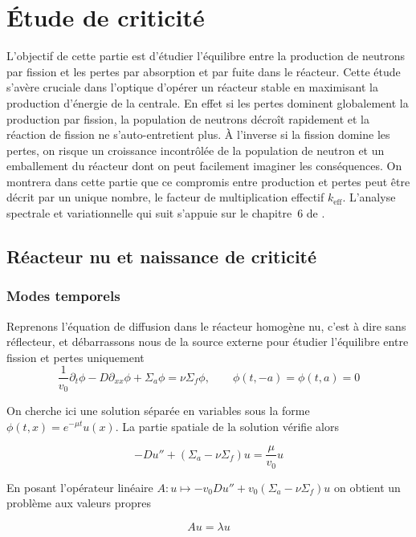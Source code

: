 \documentclass{article}
\newcommand{\keff}{k_{\mathrm{eff}}}
\begin{document}
\newpage

\section{Étude de criticité}
L'objectif de cette partie est d'étudier l'équilibre entre la production de neutrons par fission et les pertes par absorption et par fuite dans le réacteur. Cette étude s'avère cruciale dans l'optique d'opérer un réacteur stable en maximisant la production d'énergie de la centrale. 
En effet si les pertes dominent globalement la production par fission, la population de neutrons décroît rapidement et la réaction de fission ne s'auto-entretient plus. À l'inverse si la fission domine les pertes, on risque un croissance incontrôlée de la population de neutron et un emballement du réacteur dont on peut facilement imaginer les conséquences. 
On montrera dans cette partie que ce compromis entre production et pertes peut être décrit par un unique nombre, le facteur de multiplication effectif $\keff$. L'analyse spectrale et variationnelle qui suit s'appuie sur le chapitre~6 de \textcite{Allaire2018}.


\subsection{Réacteur nu et naissance de criticité}
\subsubsection{Modes temporels}
Reprenons l'équation de diffusion dans le réacteur homogène nu, c'est à dire sans réflecteur, et débarrassons nous de la source externe pour étudier l'équilibre entre fission et pertes uniquement  
\[
\frac{1}{v_0}\partial_t\phi - D\partial_{xx}\phi + \Sigma_a\phi = \nu\Sigma_f\phi, \qquad \phi(t,-a) = \phi(t,a)=0
\]

On cherche ici une solution séparée en variables sous la forme $\phi(t,x)= e^{-\mu t}u(x)$. La partie spatiale de la solution vérifie alors 

\begin{equation*}
    -Du'' + (\Sigma_a -\nu\Sigma_f)u = \frac{\mu}{v_0}u
\end{equation*}

En posant l'opérateur linéaire $A: u \mapsto -v_0Du'' + v_0(\Sigma_a -\nu\Sigma_f)u$ on obtient un problème aux valeurs propres 

\begin{equation}
    Au = \lambda u
\end{equation}
\end{document}
